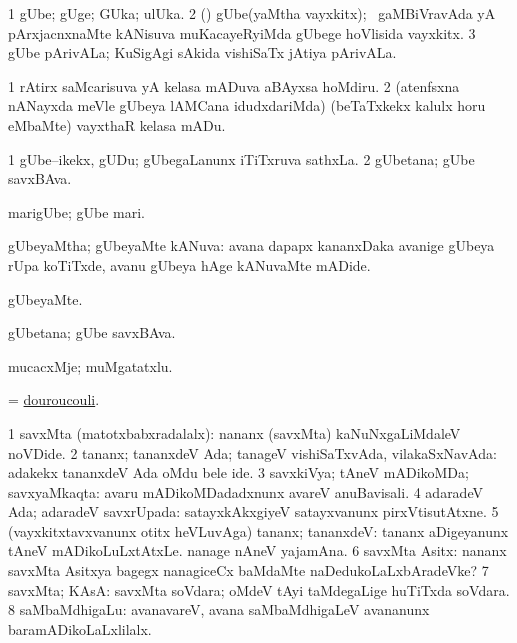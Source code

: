 \bentry
{}
\gl{\nA}
\bmng
\bnum
\num{1} gUbe; gUge; GUka; ulUka.  
\num{2} (\AmA) gUbe(yaMtha vayxkitx); \kanmu\ gaMBiVravAda yA pArxjacnxnaMte kANisuva muKacayeRyiMda gUbege hoVlisida vayxkitx. 
\num{3} gUbe pArivALa; KuSigAgi sAkida vishiSaTx jAtiya pArivALa. 
\enum
\emng

\noindent
\gl{\pagu}
\bmng
\bnum
\num{1}  rAtirx saMcarisuva yA kelasa mADuva aBAyxsa hoMdiru. 
\num{2}  (atenfsxna nANayxda meVle gUbeya lAMCana idudxdariMda) (beTaTxkekx kalulx horu eMbaMte) vayxthaR kelasa mADu. 
\enum
\emng
\eentry

\bentry
{}
\gl{\nA}
\bmng
\bnum
\num{1} gUbe--ikekx, gUDu; gUbegaLanunx iTiTxruva sathxLa. 
\num{2} gUbetana; gUbe savxBAva. 
\enum
\emng
\eentry

\bentry
{}
\gl{\nA}
\bmng
marigUbe; gUbe mari. 
\emng
\eentry

\bentry
{}
\gl{\gu}
\bmng
gUbeyaMtha; gUbeyaMte kANuva:  avana dapapx kananxDaka avanige gUbeya rUpa koTiTxde, avanu gUbeya hAge kANuvaMte mADide. 
\emng
\eentry

\bentry
{}
\gl{\kirxvi}
\bmng
gUbeyaMte. 
\emng
\eentry

\bentry
{}
\gl{\nA}
\bmng
gUbetana; gUbe savxBAva. 
\emng
\eentry

\bentry
{}
\gl{\nA}
\bmng
mucacxMje; muMgatatxlu. 
\emng
\eentry

\bentry
{}
\gl{\nA}
\bmng
= \hyperref{kandict_d.pdf}{D}{douroucouli}{douroucouli}. 
\emng
\eentry

\bentry
{}
\gl{\gu}
\bmng
\bnum
\num{1} savxMta (matotxbabxradalalx):  nananx (savxMta) kaNuNxgaLiMdaleV noVDide. 
\num{2} tananx; tananxdeV Ada; tanageV vishiSaTxvAda, vilakaSxNavAda:  adakekx tananxdeV Ada oMdu bele ide. 
\num{3} savxkiVya; tAneV mADikoMDa; savxyaMkaqta:  avaru mADikoMDadadxnunx avareV anuBavisali. 
\num{4} adaradeV Ada; adaradeV savxrUpada:  satayxkAkxgiyeV satayxvanunx pirxVtisutAtxne. 
\num{5} (vayxkitxtavxvanunx otitx heVLuvAga) tananx; tananxdeV:  tananx aDigeyanunx tAneV mADikoLuLxtAtxLe.  nanage nAneV yajamAna. 
\num{6} savxMta Asitx:  nananx savxMta Asitxya bagegx nanagiceCx baMdaMte naDedukoLaLxbAradeVke? 
\num{7} savxMta; KAsA:  savxMta soVdara; oMdeV tAyi taMdegaLige huTiTxda soVdara. 
\num{8} saMbaMdhigaLu:  avanavareV, avana saMbaMdhigaLeV avananunx baramADikoLaLxlilalx. 
\enum
\emng

